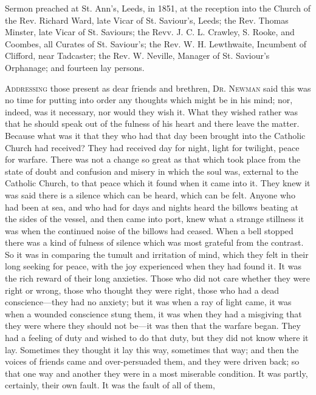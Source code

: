 
Sermon preached at St. Ann's, Leeds, in 1851, at
the reception into the Church of the Rev. Richard Ward, late Vicar of
St. Saviour's, Leeds; the Rev. Thomas Minster, late Vicar of St.
Saviours; the Revv. J. C. L. Crawley, S. Rooke, and Coombes, all
Curates of St. Saviour's; the Rev. W. H. Lewthwaite, Incumbent of
Clifford, near Tadcaster; the Rev. W. Neville, Manager of St. Saviour's
Orphanage; and fourteen lay persons.

A\textsc{ddressing} those present as
dear friends and brethren, D\textsc{r}. N\textsc{ewman}
said this was no time for putting into order any thoughts which might
be in his mind; nor, indeed, was it necessary, nor would they wish it.
What they wished rather was that he should speak out of the fulness of
his heart and there leave the matter. Because what was it that they
who had that day been brought into the Catholic Church had received?
They had received day for night, light for twilight, peace for
warfare. There was not a change so great as that which took place from
the state of doubt and confusion and misery in which the soul was,
external to the Catholic Church, to that peace which it found when it
came into it. They knew it was said there is a silence which can be
heard, which can be felt. Anyone who had been at sea, and who had for
days and nights heard the billows beating at the sides of the vessel,
and then came into port, knew what a strange stillness it was when the
continued noise of the billows had ceased. When a bell stopped there
was a kind of fulness of silence which was most grateful from the
contrast. So it was in comparing the tumult and irritation of mind,
which they felt in their long seeking for peace, with the joy
experienced when they had found it. It was the rich reward of their
long anxieties. Those who did not care whether they were right or
wrong, those who thought they were right, those who had a dead
conscience—they had no anxiety; but it was when a ray of light came, it was when a wounded conscience stung them, it was when they
had a misgiving that they were where they should not be—it was then
that the warfare began. They had a feeling of duty and wished to do
that duty, but they did not know where it lay. Sometimes they thought
it lay this way, sometimes that way; and then the voices of friends
came and over-persuaded them, and they were driven back; so that one
way and another they were in a most miserable condition. It was
partly, certainly, their own fault. It was the fault of all of them,
